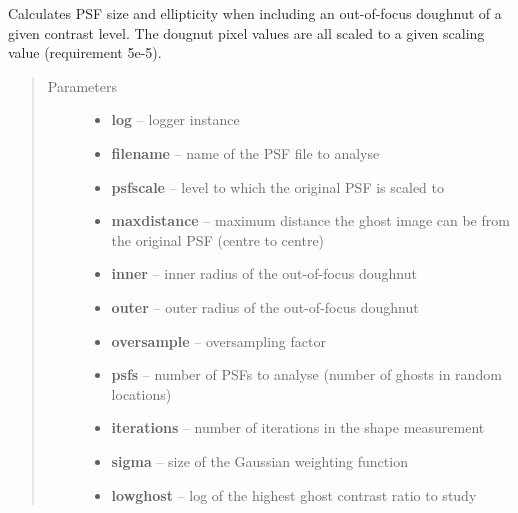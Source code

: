 \documentclass[a4paper,11pt,english]{sphinxmanual}
\begin{document}
\begin{fulllineitems}
\label{reduction:analysis.analyseGhosts.analyseOutofFocusImpact}
Calculates PSF size and ellipticity when including an out-of-focus doughnut of a given contrast level.
The dougnut pixel values are all scaled to a given scaling value (requirement 5e-5).
\begin{quote}\begin{description}
\item[{Parameters}] \leavevmode\begin{itemize}
\item {} 
\textbf{log} -- logger instance

\item {} 
\textbf{filename} -- name of the PSF file to analyse

\item {} 
\textbf{psfscale} -- level to which the original PSF is scaled to

\item {} 
\textbf{maxdistance} -- maximum distance the ghost image can be from the original PSF (centre to centre)

\item {} 
\textbf{inner} -- inner radius of the out-of-focus doughnut

\item {} 
\textbf{outer} -- outer radius of the out-of-focus doughnut

\item {} 
\textbf{oversample} -- oversampling factor

\item {} 
\textbf{psfs} -- number of PSFs to analyse (number of ghosts in random locations)

\item {} 
\textbf{iterations} -- number of iterations in the shape measurement

\item {} 
\textbf{sigma} -- size of the Gaussian weighting function

\item {} 
\textbf{lowghost} -- log of the highest ghost contrast ratio to study


\end{itemize}
\end{description}
\end{quote}
\end{fulllineitems}
\end{document}
